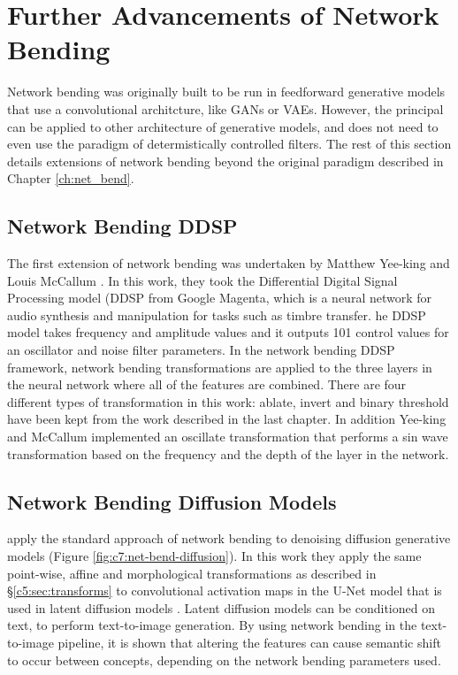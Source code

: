 \section{Further Advancements of Network Bending}

Network bending was originally built to be run in feedforward generative models that use a convolutional architcture, like GANs or VAEs. 
However, the principal can be applied to other architecture of generative models, and does not need to even use the paradigm of determistically controlled filters. 
The rest of this section details extensions of network bending beyond the original paradigm described in Chapter \ref{ch:net_bend}.

\subsection{Network Bending DDSP}
\label{c7:subsubsec:ddsp}


The first extension of network bending was undertaken by Matthew Yee-king and Louis McCallum \citep{mccallum2020network,yee2021studio}. 
In this work, they took the Differential Digital Signal Processing model (DDSP from Google Magenta, which is a neural network for audio synthesis and manipulation for tasks such as timbre transfer. 
he DDSP model takes frequency and amplitude values and it outputs 101 control values for an oscillator and noise filter parameters. 
In the network bending DDSP framework, network bending transformations are applied to the three layers in the neural network where all of the features are combined. 
There are four different types of transformation in this work: ablate, invert and binary threshold have been kept from the work described in the last chapter.
 In addition Yee-king and McCallum implemented an oscillate transformation that performs a sin wave transformation based on the frequency and the depth of the layer in the network. 

 \subsection{Network Bending Diffusion Models}

 \cite{dzwonczyk2024network} apply the standard approach of network bending to denoising diffusion generative models (Figure \ref{fig:c7:net-bend-diffusion}).
 In this work they apply the same point-wise, affine and morphological transformations as described in \S \ref{c5:sec:transforms} to convolutional activation maps in the U-Net model \citep{ronneberger2015u} that is used in latent diffusion models \citep{rombach2022high}. 
 Latent diffusion models can be conditioned on text, to perform text-to-image generation.
 By using network bending in the text-to-image pipeline, it is shown that altering the features can cause semantic shift to occur between concepts, depending on the network bending parameters used.

